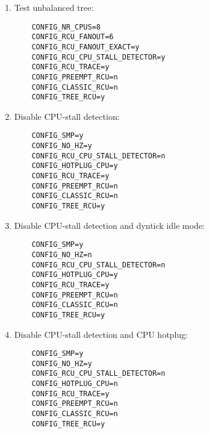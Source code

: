 \begin{enumerate}
\item	Test unbalanced tree:

\vspace{5pt}
\begin{minipage}[t]{\columnwidth}
\scriptsize
\begin{verbatim}
	CONFIG_NR_CPUS=8
	CONFIG_RCU_FANOUT=6
	CONFIG_RCU_FANOUT_EXACT=y
	CONFIG_RCU_CPU_STALL_DETECTOR=y
	CONFIG_RCU_TRACE=y
	CONFIG_PREEMPT_RCU=n
	CONFIG_CLASSIC_RCU=n
	CONFIG_TREE_RCU=y
\end{verbatim}
\end{minipage}
\vspace{5pt}

\item	Disable CPU-stall detection:

\vspace{5pt}
\begin{minipage}[t]{\columnwidth}
\scriptsize
\begin{verbatim}
	CONFIG_SMP=y
	CONFIG_NO_HZ=y
	CONFIG_RCU_CPU_STALL_DETECTOR=n
	CONFIG_HOTPLUG_CPU=y
	CONFIG_RCU_TRACE=y
	CONFIG_PREEMPT_RCU=n
	CONFIG_CLASSIC_RCU=n
	CONFIG_TREE_RCU=y
\end{verbatim}
\end{minipage}
\vspace{5pt}

\item	Disable CPU-stall detection and dyntick idle mode:

\vspace{5pt}
\begin{minipage}[t]{\columnwidth}
\scriptsize
\begin{verbatim}
	CONFIG_SMP=y
	CONFIG_NO_HZ=n
	CONFIG_RCU_CPU_STALL_DETECTOR=n
	CONFIG_HOTPLUG_CPU=y
	CONFIG_RCU_TRACE=y
	CONFIG_PREEMPT_RCU=n
	CONFIG_CLASSIC_RCU=n
	CONFIG_TREE_RCU=y
\end{verbatim}
\end{minipage}
\vspace{5pt}

\item	Disable CPU-stall detection and CPU hotplug:

\vspace{5pt}
\begin{minipage}[t]{\columnwidth}
\scriptsize
\begin{verbatim}
	CONFIG_SMP=y
	CONFIG_NO_HZ=y
	CONFIG_RCU_CPU_STALL_DETECTOR=n
	CONFIG_HOTPLUG_CPU=n
	CONFIG_RCU_TRACE=y
	CONFIG_PREEMPT_RCU=n
	CONFIG_CLASSIC_RCU=n
	CONFIG_TREE_RCU=y
\end{verbatim}
\end{minipage}
\vspace{5pt}


\end{enumerate}
